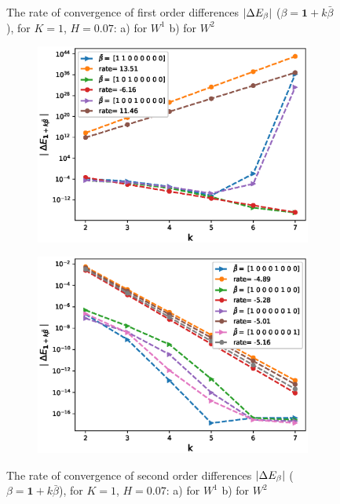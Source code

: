 \documentclass[11pt]{article}
\begin{document}
\begin{figure}[h!]
	\caption{The rate of convergence of  first order differences $\left\lvert\Delta E_{\beta}\right\rvert$ ($\beta=\mathbf{1}+k \bar{\beta}$), for $K=1$, $H=0.07$: a) for $W^1$ b) for $W^2$}
		\label{fig:first_diff_comp_K_1_H_007_wihtout_change_measure}
\end{figure}

	
	\begin{figure}[h!]
		\centering
		\begin{subfigure}{.4\textwidth}
			\centering
			\includegraphics[width=1\linewidth]{./figures/rBergomi_mixed_error_rates/without_change_measure/N_4/H_007/mixed_difference_order2_rbergomi_4steps_H_007_K_1_totally_hierarch_with_rate_W1}
			\caption{}
			\label{fig:sub3}
		\end{subfigure}%
		\begin{subfigure}{.4\textwidth}
			\centering
			\includegraphics[width=1\linewidth]{./figures/rBergomi_mixed_error_rates/without_change_measure/N_4/H_007/mixed_difference_order2_rbergomi_4steps_H_007_K_1_totally_hierarch_with_rate_W2}
			\caption{}
			\label{fig:sub4}
		\end{subfigure}
		
		\caption{The rate of convergence of  second order differences $\left\lvert\Delta E_{\beta}\right\rvert$ ($\beta=\mathbf{1}+k \bar{\beta}$), for $K=1$, $H=0.07$: a) for $W^1$ b) for $W^2$}
		\label{fig:second_diff_comp_K_1_H_007_wihtout_change_measure}
	\end{figure}
	
\end{document}
